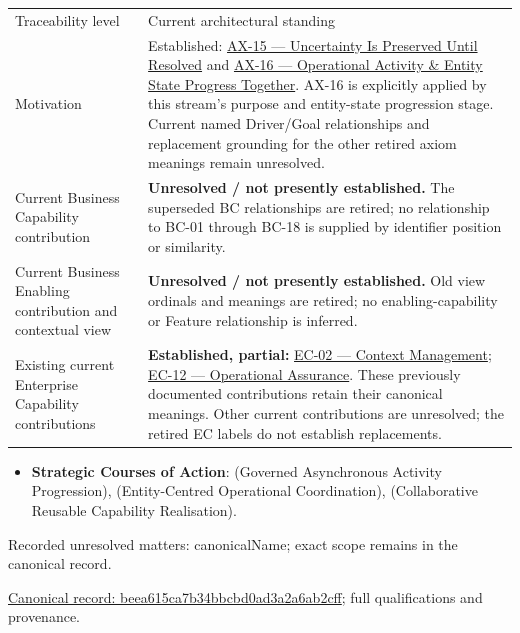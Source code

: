 \begin{longtable}{>{\raggedright\arraybackslash}p{}>{\raggedright\arraybackslash}p{}}
Traceability level & Current architectural standing \\
Motivation & Established: \hyperref[element:ef8abbaec37e4890ad78b9f263e67906]{AX-15 — Uncertainty Is Preserved Until Resolved} and \hyperref[element:de7e90f46127455a9ec9ad3b9b48ba54]{AX-16 — Operational Activity \& Entity State Progress Together}. AX-16 is explicitly applied by this stream’s purpose and entity-state progression stage. Current named Driver/Goal relationships and replacement grounding for the other retired axiom meanings remain unresolved. \\
Current Business Capability contribution & \textbf{Unresolved / not presently established.} The superseded BC relationships are retired; no relationship to BC-01 through BC-18 is supplied by identifier position or similarity. \\
Current Business Enabling contribution and contextual view & \textbf{Unresolved / not presently established.} Old view ordinals and meanings are retired; no enabling-capability or Feature relationship is inferred. \\
Existing current Enterprise Capability contributions & \textbf{Established, partial:} \href{\detokenize{../../../../../docs/markdown/02-strategy/capabilities/enterprise-capabilities.md#ec-02-context-management}}{EC-02 — Context Management}; \href{\detokenize{../../../../../docs/markdown/02-strategy/capabilities/enterprise-capabilities.md#ec-12-operational-assurance}}{EC-12 — Operational Assurance}. These previously documented contributions retain their canonical meanings. Other current contributions are unresolved; the retired EC labels do not establish replacements. \\
\end{longtable}


\begin{itemize}


\item \textbf{Strategic Courses of Action}: \texttt{} (Governed Asynchronous Activity Progression), \texttt{} (Entity-Centred Operational Coordination), \texttt{} (Collaborative Reusable Capability Realisation).

\end{itemize}

{\small Recorded unresolved matters: canonicalName; exact scope remains in the canonical record.}\par
{\footnotesize \href{../../../../continuum/strategy/value-stream/beea615ca7b34bbcbd0ad3a2a6ab2cff.md}{Canonical record: beea615ca7b34bbcbd0ad3a2a6ab2cff}; full qualifications and provenance.}\par

